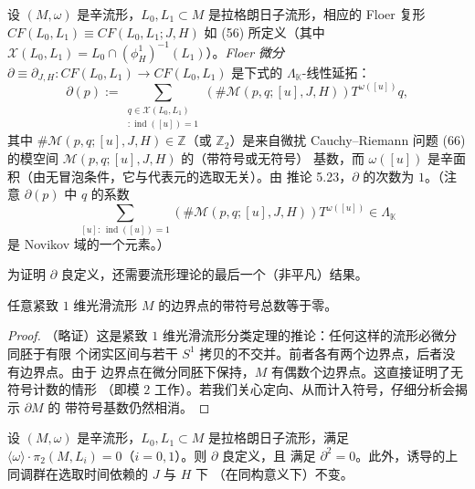 \begin{Def}\label{def:5.37}
设 $(M,\omega)$ 是辛流形，$L_0,L_1\subset M$ 是拉格朗日子流形，相应的 Floer
复形 $CF(L_0,L_1)\equiv CF(L_0,L_1;J,H)$ 如 (56) 所定义（其中
$\mathcal X(L_0,L_1)=L_0\cap(\phi_H^1)^{-1}(L_1)$）。\emph{Floer 微分}
$\partial\equiv\partial_{J,H}:CF(L_0,L_1)\to CF(L_0,L_1)$ 是下式的
$\Lambda_{\mathbb K}$-线性延拓：
\begin{equation}
\partial(p):=\sum_{\substack{q\in\mathcal X(L_0,L_1)\\
[u]:\operatorname{ind}([u])=1}}
\left(\#\mathcal M(p,q;[u],J,H)\right)T^{\omega([u])}q,
\label{eq:5.74}
\end{equation}
其中 $\#\mathcal M(p,q;[u],J,H)\in\mathbb Z$（或 $\mathbb Z_2$）是来自微扰
Cauchy--Riemann 问题 (66) 的模空间 $\mathcal M(p,q;[u],J,H)$ 的（带符号或无符号）
基数，而 $\omega([u])$ 是辛面积（由无冒泡条件，它与代表元的选取无关）。由
推论 5.23，$\partial$ 的次数为 $1$。（注意 $\partial(p)$ 中 $q$ 的系数
\[
\sum_{[u]:\,\operatorname{ind}([u])=1}
\left(\#\mathcal M(p,q;[u],J,H)\right)T^{\omega([u])}\in\Lambda_{\mathbb K}
\]
是 Novikov 域的一个元素。）
\end{Def}


为证明 $\partial$ 良定义，还需要流形理论的最后一个（非平凡）结果。

\begin{Lem}\label{lem:5.38}
任意紧致 $1$ 维光滑流形 $M$ 的边界点的带符号总数等于零。
\end{Lem}

\begin{proof}
（略证）这是紧致 $1$ 维光滑流形分类定理的推论：任何这样的流形必微分同胚于有限
个闭实区间与若干 $S^1$ 拷贝的不交并。前者各有两个边界点，后者没有边界点。由于
边界点在微分同胚下保持，$M$ 有偶数个边界点。这直接证明了无符号计数的情形
（即模 $2$ 工作）。若我们关心定向、从而计入符号，仔细分析会揭示 $\partial M$ 的
带符号基数仍然相消。
\end{proof}

\begin{Thm}\label{thm:5.39}
设 $(M,\omega)$ 是辛流形，$L_0,L_1\subset M$ 是拉格朗日子流形，满足
$\langle\omega\rangle\cdot\pi_2(M,L_i)=0$（$i=0,1$）。则 $\partial$ 良定义，且
满足 $\partial^2=0$。此外，诱导的上同调群在选取时间依赖的 $J$ 与 $H$ 下
（在同构意义下）不变。
\end{Thm}

